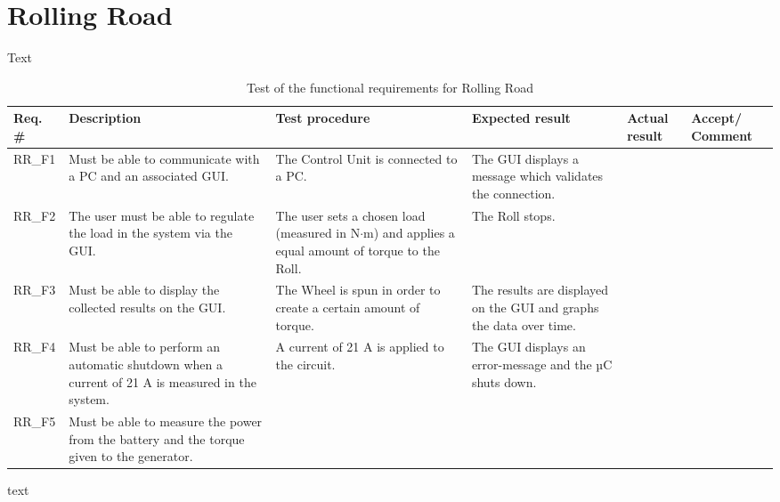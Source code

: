 \section{Rolling Road}
Text

\begin{table}[h!]
	\centering
	\label{my-label}
	\begin{tabular}{|p{1.5 cm}|p{2.1 cm}|p{2.1 cm}|p{2.1 cm}|p{2.1 cm}|p{2.1 cm}|}
		\hline
		\textbf{Req. \#} & \textbf{Description} & \textbf{Test procedure} & 
		\textbf{Expected result} & \textbf{Actual result} & \textbf{Accept/ Comment} \\ \hline
		RR\_F1 
			& Must be able to communicate with a PC and an associated GUI.
			& The Control Unit is connected to a PC.
			& The GUI displays a message which validates the connection.
			&
			& \\ \hline
		RR\_F2
			& The user must be able to regulate the load in the system via the GUI.
			& The user sets a chosen load (measured in N$\cdot$m) and applies a equal amount of torque to the Roll.
			& The Roll stops.
			& 
			& \\ \hline
		RR\_F3 
			& Must be able to display the collected results on the GUI.
			& The Wheel is spun in order to create a certain amount of torque.
			& The results are displayed on the GUI and graphs the data over time.
			& 
			& \\ \hline
		RR\_F4 
			& Must be able to perform an automatic shutdown when a current of 21 A is measured in the system.
			& A current of 21 A is applied to the circuit.
			& The GUI displays an error-message and the µC shuts down.
			&
			& \\ \hline
		RR\_F5 
			& Must be able to measure the power from the battery and the torque given to the generator. 
			& 
			&
			&
			& \\ \hline
	\end{tabular}
	\caption{Test of the functional requirements for Rolling Road}
\end{table}

text

